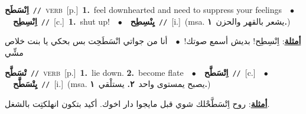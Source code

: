 \documentclass[10pt,a4paper,twoside]{article} %
\begin{document}
\begin{multicols}{2}
{\setlength\topsep{0pt}\textbf{\foreignlanguage{arabic}{اِنْسَطَح}}\ {\color{gray}\texttt{//}\color{black}}\ \textsc{verb}\ [p.]\ \textbf{1.}~feel downhearted and need to suppress your feelings\ \ $\bullet$\ \ \setlength\topsep{0pt}\textbf{\foreignlanguage{arabic}{اِنْسِطِح}}\ {\color{gray}\texttt{//}\color{black}}\ [c.]\ \textbf{1.}~shut up!\ \ $\bullet$\ \ \setlength\topsep{0pt}\textbf{\foreignlanguage{arabic}{يِنْسِطِح}}\ {\color{gray}\texttt{//}\color{black}}\ [i.]\ \color{gray}(msa. \foreignlanguage{arabic}{يشعر بالقهر والحزن}~\foreignlanguage{arabic}{\textbf{١.}})\color{black}\  \begin{flushright}\color{gray}\foreignlanguage{arabic}{\textbf{\underline{\foreignlanguage{arabic}{أمثلة}}}: اِنْسِطِح! بديش أسمع صوتك!\ $\bullet$\ \  أنا من جواتي انْسَطَحِت بس بحكي يا بنت خلاص مشِّي}\end{flushright}\color{black}} \vspace{2mm}

{\setlength\topsep{0pt}\textbf{\foreignlanguage{arabic}{تْسَطَّح}}\ {\color{gray}\texttt{//}\color{black}}\ \textsc{verb}\ [p.]\ \textbf{1.}~lie down.  \textbf{2.}~become flate\ \ $\bullet$\ \ \setlength\topsep{0pt}\textbf{\foreignlanguage{arabic}{اِتْسَطَّح}}\ {\color{gray}\texttt{//}\color{black}}\ [c.]\ \ $\bullet$\ \ \setlength\topsep{0pt}\textbf{\foreignlanguage{arabic}{يِتْسَطَّح}}\ {\color{gray}\texttt{//}\color{black}}\ [i.]\ \color{gray}(msa. \foreignlanguage{arabic}{يصبح يمستوى واحد}~\foreignlanguage{arabic}{\textbf{٢.}}  \foreignlanguage{arabic}{يستلْقي}~\foreignlanguage{arabic}{\textbf{١.}})\color{black}\  \begin{flushright}\color{gray}\foreignlanguage{arabic}{\textbf{\underline{\foreignlanguage{arabic}{أمثلة}}}: روح اِتْسَطَّحْلك شوي قبل مايجوا دار اخوك. أكيد بتكون انهلكتِت بالشغل.}\end{flushright}\color{black}} \vspace{2mm}


\end{multicols}
\end{document}
